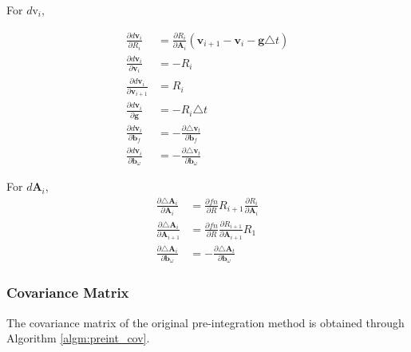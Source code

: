\documentclass[12pt]{article}   %
\begin{document}
For $d\text{v}_{i}$,

\begin{align}
\frac{\partial d\textbf{v}_{i}}{\partial R_{i}} &= \frac{\partial R_i}{\partial \textbf{A}_i} (\textbf{v}_{i+1} - \textbf{v}_i - \textbf{g} \triangle t) \\
\frac{\partial d\textbf{v}_{i}}{\partial \textbf{v}_{i}} &= -R_i \\
\frac{\partial d\textbf{v}_{i}}{\partial \textbf{v}_{i+1}} &= R_i \\
\frac{\partial d\textbf{v}_{i}}{\partial \textbf{g}} &= -R_i \triangle t \\
\frac{\partial d\textbf{v}_{i}}{\partial \textbf{b}_f} &= - \frac{\partial \triangle \textbf{v}_t}{\partial \textbf{b}_f}\\
\frac{\partial d\textbf{v}_{i}}{\partial \textbf{b}_\omega} &= - \frac{\partial \triangle \textbf{v}_t}{\partial \textbf{b}_\omega}
\end{align}

For $d\textbf{A}_{i}$,
\begin{align}
\frac{\partial \triangle \textbf{A}_{i}}{\partial \textbf{A}_{i}} &= \frac{\partial fn}{\partial R} R_{i+1} \frac{\partial R_i}{\partial \textbf{A}_{i}}\\
\frac{\partial \triangle \textbf{A}_{i}}{\partial \textbf{A}_{i+1}} &= \frac{\partial fn}{\partial R} \frac{\partial R_{i+1}}{\partial \textbf{A}_{i+1}} R_{1} \\
\frac{\partial \triangle \textbf{A}_{i}}{\partial \textbf{b}_\omega} &= - \frac{\partial \triangle \textbf{A}_t}{\partial \textbf{b}_\omega}
\end{align}

\subsubsection{Covariance Matrix}

The covariance matrix of the original pre-integration method is obtained through Algorithm \ref{algm:preint_cov}.
\end{document}
